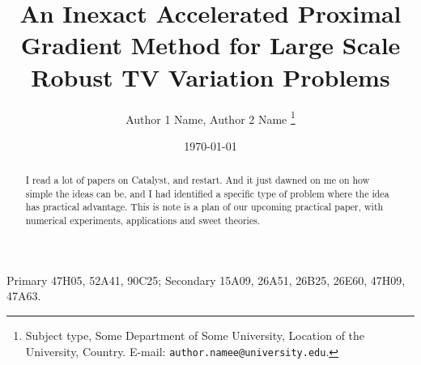 \documentclass[12pt]{article}
\begin{document}
\title{{\selectfont An Inexact Accelerated Proximal Gradient Method for Large Scale Robust TV Variation Problems}}

\author{
    Author 1 Name, Author 2 Name
    \thanks{
        Subject type, Some Department of Some University, Location of the University,
        Country. E-mail: \texttt{author.namee@university.edu}.
    }
}

\date{\today}

\maketitle
{}

\begin{abstract} 
    \noindent
    I read a lot of papers on Catalyst, and restart. 
    And it just dawned on me on how simple the ideas can be, and I had identified a specific type of problem where the idea has practical advantage. 
    This is note is a plan of our upcoming practical paper, with numerical experiments, applications and sweet theories. 
\end{abstract}

Primary 47H05, 52A41, 90C25; Secondary 15A09, 26A51, 26B25, 26E60, 47H09, 47A63.

\end{document}
